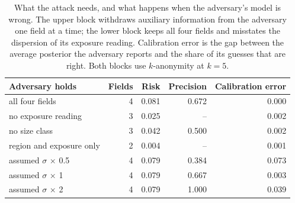 \begin{table}[t]
\centering
\caption{What the attack needs, and what happens when the adversary's model is wrong. The upper block withdraws auxiliary information from the adversary one field at a time; the lower block keeps all four fields and misstates the dispersion of its exposure reading. Calibration error is the gap between the average posterior the adversary reports and the share of its guesses that are right. Both blocks use $k$-anonymity at $k=5$.}
\label{tab:ablation}
\small
\begin{tabular}{lrrrr}
\toprule
Adversary holds & Fields & Risk & Precision & Calibration error \\
\midrule
all four fields & 4 & 0.081 & 0.672 & 0.000 \\
no exposure reading & 3 & 0.025 & -- & 0.002 \\
no size class & 3 & 0.042 & 0.500 & 0.002 \\
region and exposure only & 2 & 0.004 & -- & 0.001 \\
\midrule
assumed $\sigma$ $\times$ 0.5 & 4 & 0.079 & 0.384 & 0.073 \\
assumed $\sigma$ $\times$ 1 & 4 & 0.079 & 0.667 & 0.003 \\
assumed $\sigma$ $\times$ 2 & 4 & 0.079 & 1.000 & 0.039 \\
\bottomrule
\end{tabular}
\end{table}
